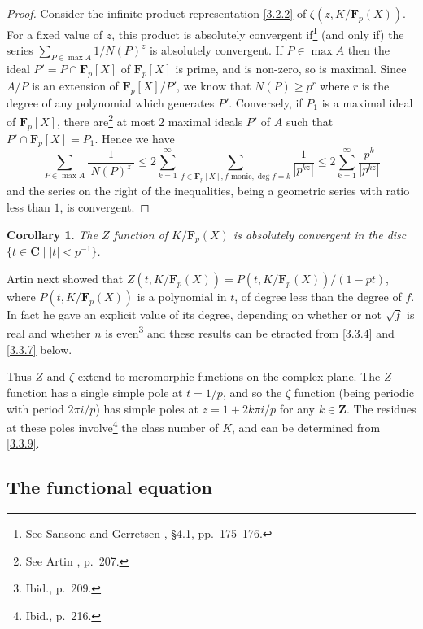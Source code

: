 \documentclass[10pt]{article}
\newtheorem{coro}[theo]{Corollary}
\theoremstyle{definition}
\def\ZZ{\mathbf{Z}}
\def\CC{\mathbf{C}}
\def\FF{\mathbf{F}}
\def\fntwfi{See Sansone and Gerretsen \cite{bib:162}, \S4.1, pp.~175--176.}
\def\fntwsi{See Artin \cite{bib:6}, p.~207.}
\def\fntwse{Ibid., p.~209.}
\def\fntwei{Ibid., p.~216.}
\begin{document}
\begin{proof}
Consider the infinite product representation \eqref{3.2.2} of $\zeta(z, K/\FF_p(X))$.
For a fixed value of $z$, this product is absolutely convergent if\footnote{\fntwfi} (and only if) the series $\sum_{P \in \max A} 1/N(P)^z$ is absolutely convergent.
If $P \in \max A$ then the ideal $P' = P \cap \FF_p[X]$ of $\FF_p[X]$ is prime, and is non-zero, so is maximal.
Since $A/P$ is an extension of $\FF_p[X] / P'$, we know that $N(P) \geq p^r$ where $r$ is the degree of any polynomial which generates $P'$.
Conversely, if $P_1$ is a maximal ideal of $\FF_p[X]$, there are\footnote{\fntwsi} at most $2$ maximal ideals $P'$ of $A$ such that $P' \cap \FF_p[X] = P_1$.
Hence we have
\[
\sum_{P \in \max A} \frac{1}{|N(P)^z|}
\leq 2 \sum_{k=1}^\infty \sum_{f \in \FF_p[X], \text{$f$ monic}, \deg f = k} \frac{1}{|p^{kz}|}
\leq 2 \sum_{k=1}^\infty \frac{p^k}{|p^{kz}|}
\]
and the series on the right of the inequalities, being a geometric series with ratio less than $1$, is convergent.
\end{proof}


\begin{coro}
\label{3.2.5}
The $Z$ function of $K / \FF_p(X)$ is absolutely convergent in the disc $\{ t \in \CC \mid |t| < p^{-1} \}$.
\end{coro}

Artin next showed that $Z(t, K/\FF_p(X)) = P(t, K/\FF_p(X)) / (1 - pt)$, where $P(t, K/\FF_p(X))$ is a polynomial in $t$, of degree less than the degree of $f$.
In fact he gave an explicit value of its degree, depending on whether or not $\sqrt f$ is real and whether $n$ is even\footnote{\fntwse} and these results can be etracted from \eqref{3.3.4} and \eqref{3.3.7} below.

Thus $Z$ and $\zeta$ extend to meromorphic functions on the complex plane.
The $Z$ function has a single simple pole at $t = 1/p$, and so the $\zeta$ function (being periodic with period $2\pi i / p$) has simple poles at $z = 1 + 2k \pi i / p$ for any $k \in \ZZ$.
The residues at these poles involve\footnote{\fntwei} the class number of $K$, and can be determined from \eqref{3.3.9}.


\subsection{The functional equation}
\label{ch:3.3}
\end{document}
